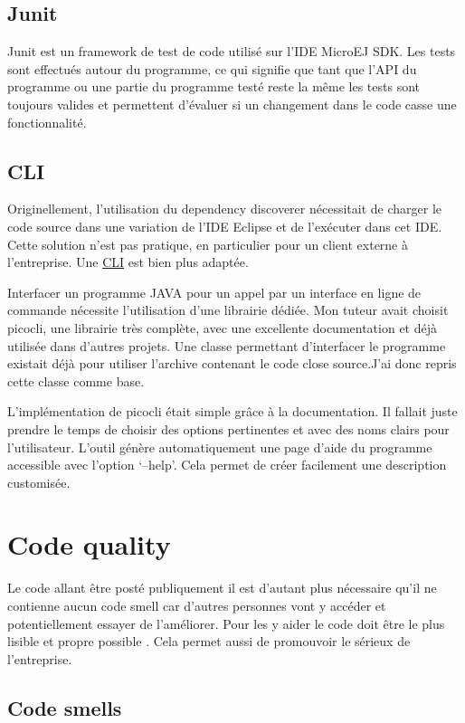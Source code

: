 \documentclass[french,a4paper,12pt]{report}
\begin{document}
\subsection{Junit}

Junit est un framework de test de code utilisé sur l’IDE MicroEJ SDK. Les tests sont effectués autour du programme, ce qui signifie que tant que l’API du programme ou une partie du programme testé reste la même les tests sont toujours valides et permettent d’évaluer si un changement dans le code casse une fonctionnalité.

\subsection{CLI}

Originellement, l'utilisation du dependency discoverer nécessitait de charger le code source dans une variation de l'IDE Eclipse et de l’exécuter dans cet IDE. Cette solution n'est pas pratique, en particulier pour un client externe à l'entreprise. Une \hyperlink{CLI}{CLI} est bien plus adaptée.

Interfacer un programme JAVA pour un appel par un interface en ligne de commande nécessite l’utilisation d’une librairie dédiée. Mon tuteur avait choisit picocli, une librairie très complète, avec une excellente documentation et déjà utilisée dans d'autres projets. Une classe permettant d’interfacer le programme existait déjà pour utiliser l’archive contenant le code close source.J’ai donc repris cette classe comme base. 

L’implémentation de picocli était simple grâce à la documentation. Il fallait juste prendre le temps de choisir  des options pertinentes et avec des noms clairs pour l’utilisateur. L’outil génère automatiquement une page d’aide du programme accessible avec l’option ‘--help’. Cela permet de créer facilement une description customisée.

\section{Code quality}

Le code allant être posté publiquement il est d’autant plus nécessaire qu’il ne contienne aucun code smell car d’autres personnes vont y accéder et potentiellement essayer de l’améliorer. Pour les y aider le code doit être le plus lisible et propre possible . Cela permet aussi de promouvoir le sérieux de l’entreprise. 

\subsection{Code smells}
\end{document}
